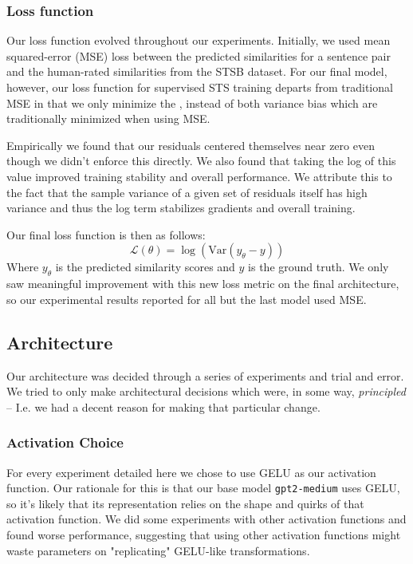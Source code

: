 \documentclass{article}
\begin{document}
\subsubsection{Loss function}
Our loss function evolved throughout our experiments. Initially, we used mean squared-error (MSE) loss between the predicted similarities for a sentence pair and the human-rated similarities from the STSB dataset. For our final model, however, our loss function for supervised STS training departs from traditional MSE in that we only minimize the , instead of both variance  bias which are traditionally minimized when using MSE. 

Empirically we found that our residuals centered themselves near zero even though we didn't enforce this directly. We also found that taking the log of this value improved training stability and overall performance. We attribute this to the fact that the sample variance of a given set of residuals itself has high variance and thus the log term stabilizes gradients and overall training. 

Our final loss function is then as follows:
$$
\mathcal{L}(\theta) = \log(\text{Var}(y_\theta - y))
$$
Where $y_\theta$ is the predicted similarity scores and $y$ is the ground truth. We only saw meaningful improvement with this new loss metric on the final architecture, so our experimental results reported for all but the last model used MSE.

\subsection{Architecture} \label{Architecture}
Our architecture was decided through a series of experiments and trial and error. We tried to only make architectural decisions which were, in some way, \textit{principled} -- I.e. we had a decent reason for making that particular change.

\subsubsection{Activation Choice}
For every experiment detailed here we chose to use GELU as our activation function. Our rationale for this is that our base model \verb|gpt2-medium| uses GELU, so it's likely that its representation relies on the shape and quirks of that activation function. We did some experiments with other activation functions and found worse performance, suggesting that using other activation functions might waste parameters on "replicating" GELU-like transformations.
\end{document}
